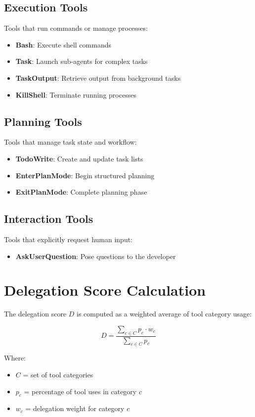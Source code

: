 \subsection{Execution Tools}
Tools that run commands or manage processes:
\begin{itemize}
    \item \textbf{Bash}: Execute shell commands
    \item \textbf{Task}: Launch sub-agents for complex tasks
    \item \textbf{TaskOutput}: Retrieve output from background tasks
    \item \textbf{KillShell}: Terminate running processes
\end{itemize}

\subsection{Planning Tools}
Tools that manage task state and workflow:
\begin{itemize}
    \item \textbf{TodoWrite}: Create and update task lists
    \item \textbf{EnterPlanMode}: Begin structured planning
    \item \textbf{ExitPlanMode}: Complete planning phase
\end{itemize}

\subsection{Interaction Tools}
Tools that explicitly request human input:
\begin{itemize}
    \item \textbf{AskUserQuestion}: Pose questions to the developer
\end{itemize}

\section{Delegation Score Calculation}

The delegation score $D$ is computed as a weighted average of tool category usage:

\begin{equation}
D = \frac{\sum_{c \in C} p_c \cdot w_c}{\sum_{c \in C} p_c}
\end{equation}

Where:
\begin{itemize}
    \item $C$ = set of tool categories
    \item $p_c$ = percentage of tool uses in category $c$
    \item $w_c$ = delegation weight for category $c$
\end{itemize}

